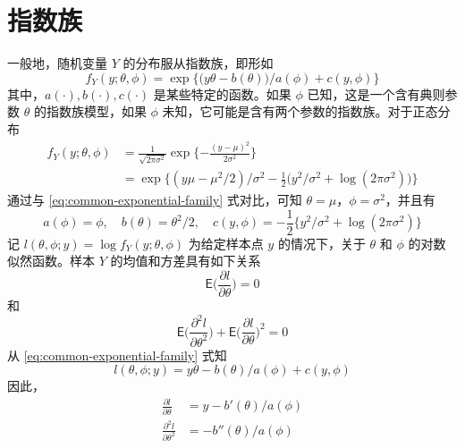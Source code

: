 \documentclass[12pt,a4paper,UTF8,twoside]{book}
\theoremstyle{definition}
\theoremstyle{definition}
\theoremstyle{definition}
\theoremstyle{remark}
\begin{document}
\hypertarget{sec:exp}{%
\section{指数族}\label{sec:exp}}

一般地，随机变量 \(Y\) 的分布服从指数族，即形如
\begin{equation}
f_{Y}(y;\theta,\phi) = \exp\big\{ \big(y\theta - b(\theta) \big)/a(\phi) + c(y,\phi) \big\}
\label{eq:common-exponential-family}
\end{equation}
\noindent 其中，\(a(\cdot),b(\cdot),c(\cdot)\) 是某些特定的函数。如果 \(\phi\) 已知，这是一个含有典则参数 \(\theta\) 的指数族模型，如果 \(\phi\) 未知，它可能是含有两个参数的指数族。对于正态分布
\begin{equation}
\begin{aligned}
f_{Y}(y;\theta,\phi) & = \frac{1}{\sqrt{2\pi\sigma^2}} \exp\{-\frac{(y - \mu)^2}{2\sigma^2}  \}  \\
 & = \exp\big \{ (y\mu - \mu^2/2)/\sigma^2 - \frac{1}{2}\big(y^2/\sigma^2 + \log(2\pi\sigma^2)\big) \big\}
\end{aligned} \label{eq:normal-distribution}
\end{equation}
\noindent 通过与 \eqref{eq:common-exponential-family} 式对比，可知 \(\theta = \mu\)，\(\phi = \sigma^2\)，并且有
\[
a(\phi) = \phi, \quad b(\theta) = \theta^2/2, \quad c(y,\phi) = - \frac{1}{2}\{ y^2/\sigma^2 + \log(2\pi\sigma^2) \} 
\]
\noindent 记 \(l(\theta,\phi;y) = \log f_{Y}(y;\theta,\phi)\) 为给定样本点 \(y\) 的情况下，关于 \(\theta\) 和 \(\phi\) 的对数似然函数。样本 \(Y\) 的均值和方差具有如下关系 \citep{McCullagh1989}
\begin{equation}
\mathsf{E}\big( \frac{\partial l}{\partial \theta} \big) = 0
\label{eq:mean-log-lik}
\end{equation}
\noindent 和
\begin{equation}
\mathsf{E}\big( \frac{\partial^2 l}{\partial \theta^2} \big) + \mathsf{E}\big(\frac{\partial l}{\partial \theta}\big)^2  = 0
\label{eq:variance-log-lik}
\end{equation}
\noindent 从 \eqref{eq:common-exponential-family} 式知
\[ l(\theta,\phi;y) = {y\theta - b(\theta)}/a(\phi) + c(y,\phi) \]
\noindent 因此，
\begin{equation}
\begin{aligned}
\frac{\partial l}{\partial \theta} & = {y - b'(\theta)}/a(\phi)  \\
\frac{\partial^2 l}{\partial \theta^2}  & = - b''(\theta)/a(\phi)
\end{aligned} \label{eq:partial-log-lik}
\end{equation}
\end{document}
